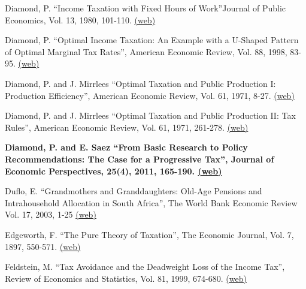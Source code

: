 \documentclass[landscape]{slides}
\begin{document}
\begin{slide}
{Diamond, P. ``Income Taxation with Fixed Hours of Work''Journal of Public Economics, Vol. 13, 1980, 101-110. \href{http://elsa.berkeley.edu/~saez/course/Diamond_JPubE(1980).pdf} {(web)}

Diamond, P. ``Optimal Income Taxation: An Example with a U-Shaped Pattern of Optimal Marginal Tax Rates'', American Economic Review, Vol. 88, 1998, 83-95. \href{http://links.jstor.org/stable/pdfplus/116819.pdf} {(web)}

Diamond, P. and J. Mirrlees ``Optimal Taxation and Public Production I: Production Efficiency'', American Economic Review, Vol. 61, 1971, 8-27. \href{http://links.jstor.org/stable/pdfplus/1910538.pdf} {(web)}

Diamond, P. and J. Mirrlees ``Optimal Taxation and Public Production II: Tax Rules'', American Economic Review, Vol. 61, 1971, 261-278. \href{http://links.jstor.org/stable/pdfplus/1813425.pdf} {(web)}

\textbf{Diamond, P. and E. Saez ``From Basic Research to Policy Recommendations:
The Case for a Progressive Tax'', Journal of Economic Perspectives, 25(4), 2011, 165-190.
\href{http://elsa.berkeley.edu/~saez/diamond-saezJEP11full.pdf} {(web)} }


Duflo, E. ``Grandmothers and Granddaughters: Old-Age Pensions and Intrahousehold Allocation in South Africa'', The World Bank Economic Review
Vol. 17, 2003, 1-25 \href{http://www.jstor.org/stable/pdfplus/3990043.pdf} {(web)}

Edgeworth, F. ``The Pure Theory of Taxation'', The Economic Journal, Vol. 7, 1897, 550-571. \href{http://www.jstor.org/stable/pdfplus/2956603.pdf} {(web)}

Feldstein, M. ``Tax Avoidance and the Deadweight Loss of the Income Tax'', Review of Economics and Statistics, Vol. 81, 1999, 674-680. \href{http://links.jstor.org/stable/pdfplus/2646716.pdf} {(web)}



}
\end{slide}
\end{document}
